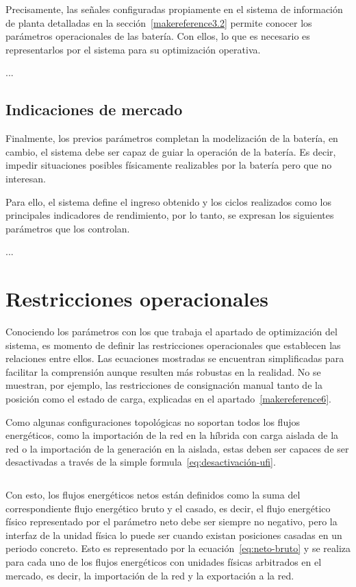 Precisamente, las señales configuradas propiamente en el sistema de información de planta detalladas en la sección~\ref{makereference3.2} permite conocer los parámetros operacionales de las batería. Con ellos, lo que es necesario es representarlos por el sistema para su optimización operativa.

...

\subsection{Indicaciones de mercado}
\label{makereference5.1.4}

Finalmente, los previos parámetros completan la modelización de la batería, en cambio, el sistema debe ser capaz de guiar la operación de la batería. Es decir, impedir situaciones posibles físicamente realizables por la batería pero que no interesan.

Para ello, el sistema define el ingreso obtenido y los ciclos realizados como los principales indicadores de rendimiento, por lo tanto, se expresan los siguientes parámetros que los controlan.

...

\section{Restricciones operacionales}
\label{makereference5.2}

Conociendo los parámetros con los que trabaja el apartado de optimización del sistema, es momento de definir las restricciones operacionales que establecen las relaciones entre ellos. Las ecuaciones mostradas se encuentran simplificadas para facilitar la comprensión aunque resulten más robustas en la realidad. No se muestran, por ejemplo, las restricciones de consignación manual tanto de la posición como el estado de carga, explicadas en el apartado~\ref{makereference6}.

Como algunas configuraciones topológicas no soportan todos los flujos energéticos, como la importación de la red en la híbrida con carga aislada de la red o la importación de la generación en la aislada, estas deben ser capaces de ser desactivadas a través de la simple formula~\ref{eq:desactivación-ufi}.

\begin{equation}
  \label{eq:desactivación-ufi}
\end{equation}

Con esto, los flujos energéticos netos están definidos como la suma del correspondiente flujo energético bruto y el casado, es decir, el flujo energético físico representado por el parámetro neto debe ser siempre no negativo, pero la interfaz de la unidad física lo puede ser cuando existan posiciones casadas en un periodo concreto. Esto es representado por la ecuación~\ref{eq:neto-bruto} y se realiza para cada uno de los flujos energéticos con unidades físicas arbitrados en el mercado, es decir, la importación de la red y la exportación a la red.

